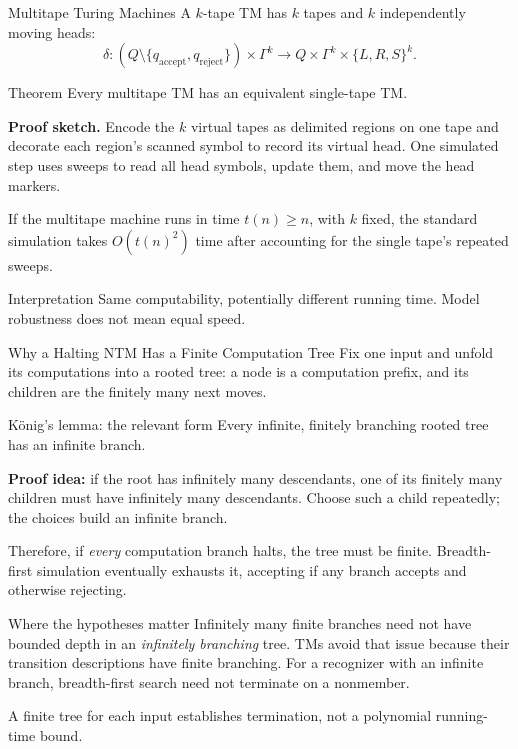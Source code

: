 \documentclass[10pt]{beamer}
\begin{document}
\begin{frame}{Multitape Turing Machines}
  \small
  A $k$-tape TM has $k$ tapes and $k$ independently moving heads:
  \[
    \delta:(Q\setminus\{q_{\mathrm{accept}},q_{\mathrm{reject}}\})
    \times\Gamma^k\to Q\times\Gamma^k\times\{L,R,S\}^k.
  \]
  \begin{block}{Theorem}
    Every multitape TM has an equivalent single-tape TM.
  \end{block}
  \textbf{Proof sketch.}
  Encode the $k$ virtual tapes as delimited regions on one tape and decorate each region's scanned
  symbol to record its virtual head. One simulated step uses sweeps to read all head symbols,
  update them, and move the head markers.

  If the multitape machine runs in time $t(n)\ge n$, with $k$ fixed,
  the standard simulation takes
  $O(t(n)^2)$ time after accounting for the single tape's repeated sweeps.
  \begin{alertblock}{Interpretation}
    Same computability, potentially different running time. Model robustness does not mean equal speed.
  \end{alertblock}
\end{frame}

\begin{frame}{Why a Halting NTM Has a Finite Computation Tree}
  \small
  Fix one input and unfold its computations into a rooted tree: a node is
  a computation prefix, and its children are the finitely many next moves.
  \begin{block}{K\"onig's lemma: the relevant form}
    Every infinite, finitely branching rooted tree has an infinite branch.
  \end{block}
  \textbf{Proof idea:} if the root has infinitely many descendants, one of
  its finitely many children must have infinitely many descendants. Choose
  such a child repeatedly; the choices build an infinite branch.
  \par\smallskip
  Therefore, if \emph{every} computation branch halts, the tree must be
  finite. Breadth-first simulation eventually exhausts it, accepting if
  any branch accepts and otherwise rejecting.
  \begin{alertblock}{Where the hypotheses matter}
    Infinitely many finite branches need not have bounded depth in an
    \emph{infinitely branching} tree. TMs avoid that issue because their
    transition descriptions have finite branching. For a recognizer with
    an infinite branch, breadth-first search need not terminate on a nonmember.
  \end{alertblock}
  A finite tree for each input establishes termination, not a polynomial
  running-time bound.
\end{frame}
\end{document}
